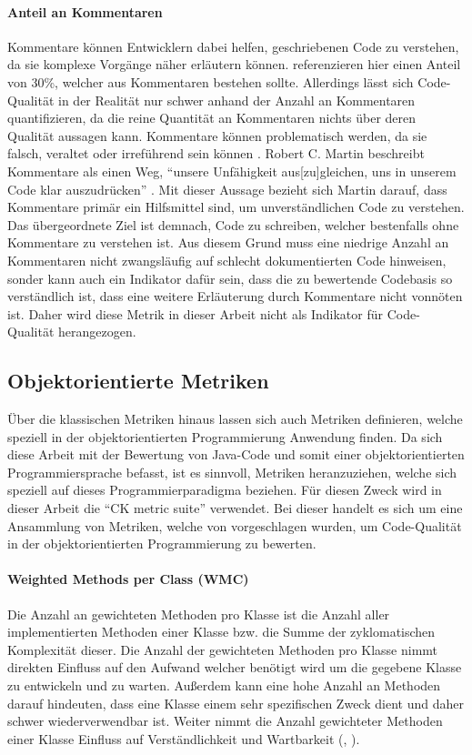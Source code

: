 \documentclass[a4paper, 12pt]{article}
\begin{document}
\paragraph{Anteil an Kommentaren}
Kommentare können Entwicklern dabei helfen, geschriebenen Code zu verstehen, da sie komplexe Vorgänge näher erläutern können. 
\textcite{Linda_softwarequality} referenzieren hier einen Anteil von 30\%, welcher aus Kommentaren bestehen sollte.
Allerdings lässt sich Code-Qualität in der Realität nur schwer anhand der Anzahl an Kommentaren quantifizieren, da die reine Quantität an Kommentaren nichts über deren Qualität aussagen kann.
Kommentare können problematisch werden, da sie falsch, veraltet oder irreführend sein können \parencites[85]{Martin2009}.
Robert C. Martin beschreibt Kommentare als einen Weg, \enquote{unsere Unfähigkeit aus[zu]gleichen, uns in unserem Code klar auszudrücken} \parencites[85]{Martin2009}.
Mit dieser Aussage bezieht sich Martin darauf, dass Kommentare primär ein Hilfsmittel sind, um unverständlichen Code zu verstehen.
Das übergeordnete Ziel ist demnach, Code zu schreiben, welcher bestenfalls ohne Kommentare zu verstehen ist.
Aus diesem Grund muss eine niedrige Anzahl an Kommentaren nicht zwangsläufig auf schlecht dokumentierten Code hinweisen, sonder kann auch ein Indikator dafür sein, dass die zu bewertende Codebasis so verständlich ist, dass eine weitere Erläuterung durch Kommentare nicht vonnöten ist.
Daher wird diese Metrik in dieser Arbeit nicht als Indikator für Code-Qualität herangezogen.

\subsection{Objektorientierte Metriken}
Über die klassischen Metriken hinaus lassen sich auch Metriken definieren, welche speziell in der objektorientierten Programmierung Anwendung finden.
Da sich diese Arbeit mit der Bewertung von Java-Code und somit einer objektorientierten Programmiersprache befasst, ist es sinnvoll, Metriken heranzuziehen, welche sich speziell auf dieses Programmierparadigma beziehen.
Für diesen Zweck wird in dieser Arbeit die \enquote{CK metric suite} verwendet.
Bei dieser handelt es sich um eine Ansammlung von Metriken, welche von \textcite{Metrics_OO_design} vorgeschlagen wurden, um Code-Qualität in der objektorientierten Programmierung zu bewerten.

\paragraph{Weighted Methods per Class (WMC)}
Die Anzahl an gewichteten Methoden pro Klasse ist die Anzahl aller implementierten Methoden einer Klasse bzw. die Summe der zyklomatischen Komplexität dieser. 
Die Anzahl der gewichteten Methoden pro Klasse nimmt direkten Einfluss auf den Aufwand welcher benötigt wird um die gegebene Klasse zu entwickeln und zu warten.
Außerdem kann eine hohe Anzahl an Methoden darauf hindeuten, dass eine Klasse einem sehr spezifischen Zweck dient und daher schwer wiederverwendbar ist. Weiter  nimmt die Anzahl gewichteter Methoden einer Klasse Einfluss auf Verständlichkeit und Wartbarkeit (\textcite{Metrics_OO_design}, \textcite{Linda_softwarequality}).
\end{document}
